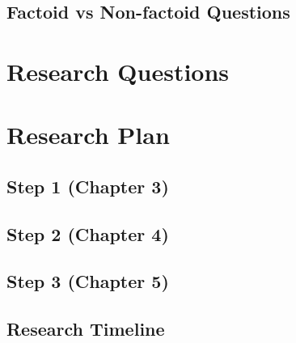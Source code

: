 \subsection{Factoid vs Non-factoid Questions}


\section{Research Questions}

\section{Research Plan}

\subsection{Step 1 (Chapter 3)}
\label{sec:plan1}

\subsection{Step 2 (Chapter 4)}
\label{sec:plan2}

\subsection{Step 3 (Chapter 5)}
\label{sec:plan3}

\subsection{Research Timeline}





